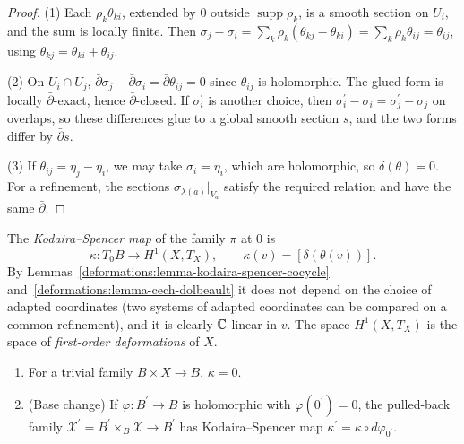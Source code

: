 \begin{proof}
(1) Each $\rho_k\theta_{ki}$, extended by $0$ outside $\operatorname{supp}\rho_k$, is a smooth section on $U_i$, and the sum is locally finite. Then
$\sigma_j - \sigma_i = \sum_k\rho_k(\theta_{kj} - \theta_{ki}) = \sum_k\rho_k\theta_{ij} = \theta_{ij}$, using $\theta_{kj} = \theta_{ki} + \theta_{ij}$.

(2) On $U_i \cap U_j$, $\bar\partial\sigma_j - \bar\partial\sigma_i = \bar\partial\theta_{ij} = 0$ since $\theta_{ij}$ is holomorphic. The glued form is locally $\bar\partial$-exact, hence $\bar\partial$-closed. If $\sigma_i^{\prime}$ is another
choice, then $\sigma_i^{\prime} - \sigma_i = \sigma_j^{\prime} - \sigma_j$ on overlaps, so these differences glue to a global smooth section $s$, and the two forms differ by $\bar\partial s$.

(3) If $\theta_{ij} = \eta_j - \eta_i$, we may take $\sigma_i = \eta_i$, which are holomorphic, so $\delta(\theta) = 0$. For a refinement, the sections $\sigma_{\lambda(a)}|_{V_a}$ satisfy the required relation and
have the same $\bar\partial$.
\end{proof}

\begin{definition}\label{deformations:definition-kodaira-spencer}
The \emph{Kodaira--Spencer map} of the family $\pi$ at $0$ is
\[
\kappa \colon T_0B \to H^1(X, T_X), \qquad \kappa(v) = [\delta(\theta(v))].
\]
By Lemmas~\ref{deformations:lemma-kodaira-spencer-cocycle} and~\ref{deformations:lemma-cech-dolbeault} it does not depend on the choice of adapted coordinates (two systems of adapted coordinates
can be compared on a common refinement), and it is clearly $\mathbb{C}$-linear in $v$. The space $H^1(X, T_X)$ is the space of \emph{first-order deformations} of $X$.
\end{definition}

\begin{proposition}\label{deformations:proposition-kodaira-spencer-properties}
\begin{enumerate}
\item For a trivial family $B \times X \to B$, $\kappa = 0$.
\item (Base change) If $\varphi \colon B^{\prime} \to B$ is holomorphic with $\varphi(0^{\prime}) = 0$, the pulled-back family $\mathcal{X}^{\prime} = B^{\prime} \times_B \mathcal{X} \to B^{\prime}$ has Kodaira--Spencer map
$\kappa^{\prime} = \kappa \circ d\varphi_{0^{\prime}}$.
\end{enumerate}
\end{proposition}

